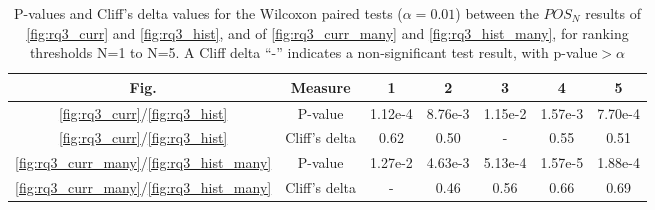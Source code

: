 
\begin{table}[t]
\caption{P-values and Cliff's delta values for the Wilcoxon paired tests ($\alpha=0.01$) between the $POS_N$ results of \autoref{fig:rq3_curr} and \autoref{fig:rq3_hist}, and of \autoref{fig:rq3_curr_many} and \autoref{fig:rq3_hist_many}, for ranking thresholds N=1 to N=5. A Cliff delta ``-'' indicates a non-significant test result, with p-value$>\alpha$}
\label{table:rq3_wilc_loc_cc}
 \begin{tabular}{c c c c c c c} 
Fig. & Measure & 1 & 2 & 3 & 4 & 5 \\
 \hline
\ref{fig:rq3_curr}/\ref{fig:rq3_hist} & P-value & 1.12e-4 & 8.76e-3 & 1.15e-2 & 1.57e-3 & 7.70e-4 \\
      \ref{fig:rq3_curr}/\ref{fig:rq3_hist}& Cliff's delta & 0.62 & 0.50 & - & 0.55 & 0.51 \\
\ref{fig:rq3_curr_many}/\ref{fig:rq3_hist_many} &  P-value & 1.27e-2 & 4.63e-3 & 5.13e-4 & 1.57e-5 & 1.88e-4 \\
   \ref{fig:rq3_curr_many}/\ref{fig:rq3_hist_many}& Cliff's delta & - & 0.46 & 0.56 & 0.66 & 0.69 \\
\end{tabular}

\end{table}





